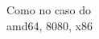 \documentclass[preview]{standalone}
\begin{document}
Como no caso do\\ amd64, 8080, x86\\
\end{document}
